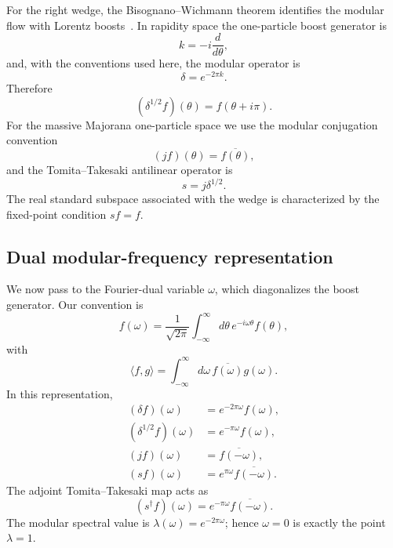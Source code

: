 \documentclass[11pt]{article}
\begin{document}
For the right wedge, the Bisognano--Wichmann theorem identifies the modular flow with Lorentz boosts~\cite{BisognanoWichmann1975,BisognanoWichmann1976}. In rapidity space the one-particle boost generator is
\begin{equation}
 k=-i\frac{d}{d\theta},
 \end{equation}
and, with the conventions used here, the modular operator is
\begin{equation}
 \delta=e^{-2\pi k}.
 \label{eq:deltaK}
\end{equation}
Therefore
\begin{equation}
 (\delta^{1/2}f)(\theta)=f(\theta+i\pi).
 \label{eq:deltahalf_theta}
\end{equation}
For the massive Majorana one-particle space we use the modular conjugation convention
\begin{equation}
 (jf)(\theta)=\overline{f(\theta)},
 \label{eq:jtheta}
\end{equation}
and the Tomita--Takesaki antilinear operator is
\begin{equation}
 s=j\delta^{1/2}.
 \label{eq:stheta_def}
\end{equation}
The real standard subspace associated with the wedge is characterized by the fixed-point condition $sf=f$.

\subsection{Dual modular-frequency representation}

We now pass to the Fourier-dual variable $\omega$, which diagonalizes the boost generator. Our convention is
\begin{equation}
 f(\omega)=\frac{1}{\sqrt{2\pi}}
 \int_{-\infty}^{\infty}d\theta\,
 e^{-i\omega\theta}f(\theta),
 \label{eq:Fourier}
\end{equation}
with
\begin{equation}
 \langle f,g\rangle
 =\int_{-\infty}^{\infty}d\omega\,
 \overline{f(\omega)}g(\omega).
\end{equation}
In this representation,
\begin{align}
 (\delta f)(\omega)&=e^{-2\pi\omega}f(\omega),
 \label{eq:deltaomega}\\
 (\delta^{1/2}f)(\omega)&=e^{-\pi\omega}f(\omega),
 \label{eq:deltahalfomega}\\
 (jf)(\omega)&=\overline{f(-\omega)},
 \label{eq:jomega}\\
 (sf)(\omega)&=e^{\pi\omega}\overline{f(-\omega)}.
 \label{eq:somega}
\end{align}
The adjoint Tomita--Takesaki map acts as
\begin{equation}
 (s^\dagger f)(\omega)=e^{-\pi\omega}\overline{f(-\omega)}.
 \label{eq:sdagomega}
\end{equation}
The modular spectral value is $\lambda(\omega)=e^{-2\pi\omega}$; hence $\omega=0$ is exactly the point $\lambda=1$.
\end{document}
